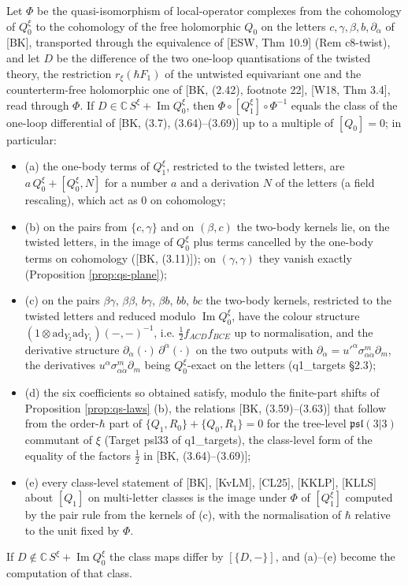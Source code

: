 \begin{theorem}
\label{thm:qs-twistcheck}
Let $\Phi$ be the quasi-isomorphism of local-operator complexes from the cohomology of $Q^\xi_0$ to the cohomology of the free holomorphic $Q_0$ on the letters $c,\gamma,\beta,b,\partial_{\dot\alpha}$ of [BK], transported through the equivalence of [ESW, Thm 10.9] (Rem c8-twist), and let $D$ be the difference of the two one-loop quantisations of the twisted theory, the restriction $r_\xi(\hbar F_1)$ of the untwisted equivariant one and the counterterm-free holomorphic one of [BK, (2.42), footnote 22], [W18, Thm 3.4], read through $\Phi$. If $D\in\mathbb C\,S^\xi+\operatorname{Im}Q^\xi_0$, then $\Phi\circ[Q^\xi_1]\circ\Phi^{-1}$ equals the class of the one-loop differential of [BK, (3.7), (3.64)--(3.69)] up to a multiple of $[Q_0]=0$; in particular:
\begin{itemize}
\item (a) the one-body terms of $Q^\xi_1$, restricted to the twisted letters, are $a\,Q^\xi_0+[Q^\xi_0,N]$ for a number $a$ and a derivation $N$ of the letters (a field rescaling), which act as $0$ on cohomology;
\item (b) on the pairs from $\{c,\gamma\}$ and on $(\beta,c)$ the two-body kernels lie, on the twisted letters, in the image of $Q^\xi_0$ plus terms cancelled by the one-body terms on cohomology ([BK, (3.11)]); on $(\gamma,\gamma)$ they vanish exactly (Proposition \ref{prop:qs-plane});
\item (c) on the pairs $\beta\gamma$, $\beta\beta$, $b\gamma$, $\beta b$, $bb$, $bc$ the two-body kernels, restricted to the twisted letters and reduced modulo $\operatorname{Im}Q^\xi_0$, have the colour structure $(1\otimes\mathrm{ad}_{Y_2}\mathrm{ad}_{Y_1})(-,-)^{-1}$, i.e. $\tfrac12f_{ACD}f_{BCE}$ up to normalisation, and the derivative structure $\partial_{\dot\alpha}(\cdot)\,\partial^{\dot\alpha}(\cdot)$ on the two outputs with $\partial_{\dot\alpha}=u'^\alpha\sigma^m_{\alpha\dot\alpha}\partial_m$, the derivatives $u^\alpha\sigma^m_{\alpha\dot\alpha}\partial_m$ being $Q^\xi_0$-exact on the letters (q1\_targets §2.3);
\item (d) the six coefficients so obtained satisfy, modulo the finite-part shifts of Proposition \ref{prop:qs-laws} (b), the relations [BK, (3.59)--(3.63)] that follow from the order-$\hbar$ part of $\{Q_1,R_0\}+\{Q_0,R_1\}=0$ for the tree-level $\mathfrak{psl}(3|3)$ commutant of $\xi$ (Target psl33 of q1\_targets), the class-level form of the equality of the factors $\tfrac12$ in [BK, (3.64)--(3.69)];
\item (e) every class-level statement of [BK], [KvLM], [CL25], [KKLP], [KLLS] about $[Q_1]$ on multi-letter classes is the image under $\Phi$ of $[Q^\xi_1]$ computed by the pair rule from the kernels of (c), with the normalisation of $\hbar$ relative to the unit fixed by $\Phi$.
\end{itemize}
If $D\notin\mathbb C\,S^\xi+\operatorname{Im}Q^\xi_0$ the class maps differ by $[\{D,-\}]$, and (a)--(e) become the computation of that class.
\end{theorem}

